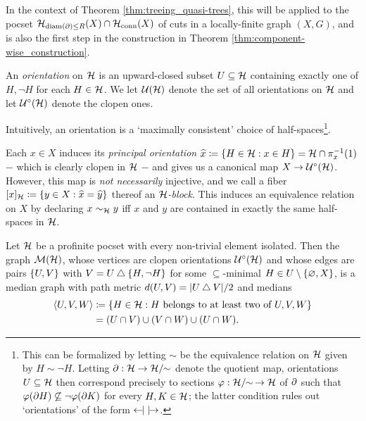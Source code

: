 \documentclass[reqno]{amsart}
\begin{document}
    In the context of Theorem \ref{thm:treeing_quasi-trees}, this will be applied to the pocset $\mathcal{H}_{\operatorname{diam}(\partial)\leq R}(X)\cap\mathcal{H}_\mathrm{conn}(X)$ of cuts in a locally-finite graph $(X,G)$, and is also the first step in the construction in Theorem \ref{thm:component-wise_construction}.
    
    \begin{definition}\label{def:orientation}
        An \textit{orientation} on $\mathcal{H}$ is an upward-closed subset $U\subseteq\mathcal{H}$ containing exactly one of $H,\lnot H$ for each $H\in\mathcal{H}$. We let $\mathcal{U}(\mathcal{H})$ denote the set of all orientations on $\mathcal{H}$ and let $\mathcal{U}^\circ(\mathcal{H})$ denote the clopen ones.

        Intuitively, an orientation is a `maximally consistent' choice of half-spaces\footnote{This can be formalized by letting $\sim$ be the equivalence relation on $\mathcal{H}$ given by $H\sim\lnot H$. Letting $\partial:\mathcal{H}\to\mathcal{H}/\!\!\sim$ denote the quotient map, orientations $U\subseteq\mathcal{H}$ then correspond precisely to sections $\varphi:\mathcal{H}/\!\!\sim\,\to\mathcal{H}$ of $\partial$ such that $\varphi(\partial H)\not\subseteq\lnot\varphi(\partial K)$ for every $H,K\in\mathcal{H}$; the latter condition rules out `orientations' of the form $\leftarrow\hspace{-4.15pt}|\,\,|\hspace{-4.15pt}\rightarrow$.}.
    \end{definition}

    \begin{example}
        Each $x\in X$ induces its \textit{principal orientation} $\widehat{x}\coloneqq\left\{H\in\mathcal{H}: x\in H\right\}=\mathcal{H}\cap\pi^{-1}_x(1)$ $-$ which is clearly clopen in $\mathcal{H}$ $-$ and gives us a canonical map $X\to\mathcal{U}^\circ(\mathcal{H})$. However, this map is \textit{not necessarily} injective, and we call a fiber $[x]_{\mathcal{H}}\coloneqq\left\{y\in X:\widehat{x}=\widehat{y}\right\}$ thereof an \textit{$\mathcal{H}$-block}. This induces an equivalence relation on $X$ by declaring $x\sim_{\mathcal{H}}y$ iff $x$ and $y$ are contained in exactly the same half-spaces in $\mathcal{H}$.
    \end{example}

    \begin{proposition}\label{prp:construction_of_dual_median_graph}
        Let $\mathcal{H}$ be a profinite pocset with every non-trivial element isolated. Then the graph $\mathcal{M}(\mathcal{H})$, whose vertices are clopen orientations $\mathcal{U}^\circ(\mathcal{H})$ and whose edges are pairs $\left\{U,V\right\}$ with $V=U\bigtriangleup\left\{H,\lnot H\right\}$ for some $\subseteq$-minimal $H\in U\setminus\left\{\varnothing,X\right\}$, is a median graph with path metric $d(U,V)=|U\bigtriangleup V|/2$ and medians
        \begin{equation*}
            \begin{aligned}
                \left\langle U,V,W\right\rangle&\coloneqq\left\{H\in\mathcal{H}: H\textrm{ belongs to at least two of }U,V,W\right\} \\
                                        &=(U\cap V)\cup(V\cap W)\cup(U\cap W).
            \end{aligned}
        \end{equation*}
    \end{proposition}
\end{document}
